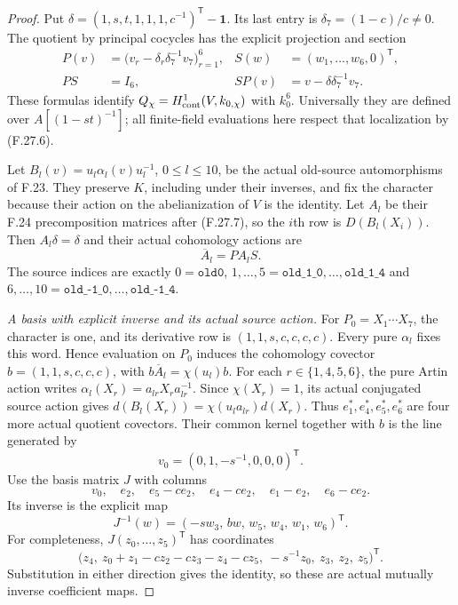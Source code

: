 \begin{proof}
Put $\delta=(1,s,t,1,1,1,c^{-1})^{\mathsf T}
-\mathbf1$. Its last entry is
$\delta_7=(1-c)/c\ne0$.
The quotient by principal cocycles has the explicit
projection and section
\[
 \begin{aligned}
 P(v)&=\bigl(v_r-\delta_r\delta_7^{-1}v_7\bigr)_{r=1}^6,
       &S(w)&=(w_1,\ldots,w_6,0)^{\mathsf T},\\
 PS&=I_6,
       &SP(v)&=v-\delta\delta_7^{-1}v_7.
 \end{aligned}                                                \tag{F.27.8}
\]
These formulas identify
$Q_\chi=H^1_{\rm cont}(V,k_{0,\chi})$ with $k_0^6$.
Universally they are defined over $A[(1-st)^{-1}]$;
all finite-field evaluations here respect that
localization by (F.27.6).

Let $B_l(v)=u_l\alpha_l(v)u_l^{-1}$, $0\leq l\leq10$,
be the actual old-source automorphisms of F.23.
They preserve $K$, including under their inverses,
and fix the character because their action on
the abelianization of $V$ is the identity.
Let $A_l$ be their F.24 precomposition matrices
after (F.27.7), so the $i$th row is $D(B_l(X_i))$.
Then $A_l\delta=\delta$ and their actual cohomology
actions are
\[
                           \overline A_l=PA_lS.
                                                               \tag{F.27.9}
\]
The source indices are exactly
$0=\texttt{old0}$,
$1,\ldots,5=\texttt{old\_1\_0},\ldots,\texttt{old\_1\_4}$
and $6,\ldots,10=\texttt{old\_-1\_0},\ldots,
\texttt{old\_-1\_4}$.

\emph{A basis with explicit inverse and its actual source action.}
For $P_0=X_1\cdots X_7$, the character is one,
and its derivative row is $(1,1,s,c,c,c,c)$.
Every pure $\alpha_l$ fixes this word. Hence
evaluation on $P_0$ induces the cohomology
covector $b=(1,1,s,c,c,c)$, with
$b\overline A_l=\chi(u_l)b$.
For each $r\in\{1,4,5,6\}$, the pure Artin
action writes $\alpha_l(X_r)=a_{lr}X_ra_{lr}^{-1}$.
Since $\chi(X_r)=1$, its actual conjugated source
action gives
$d(B_l(X_r))=\chi(u_la_{lr})d(X_r)$.
Thus $e_1^*,e_4^*,e_5^*,e_6^*$ are four more
actual quotient covectors. Their common kernel
together with $b$ is the line generated by
\[
                      v_0=(0,1,-s^{-1},0,0,0)^{\mathsf T}.
                                                               \tag{F.27.10}
\]
Use the basis matrix $J$ with columns
\[
       v_0,\quad e_2,\quad e_5-ce_2,\quad e_4-ce_2,
                       \quad e_1-e_2,\quad e_6-ce_2.
                                                               \tag{F.27.11}
\]
Its inverse is the explicit map
\[
 J^{-1}(w)=(-sw_3,\,bw,\,w_5,\,w_4,\,w_1,\,w_6)^{\mathsf T}.
                                                               \tag{F.27.12}
\]
For completeness, $J(z_0,\ldots,z_5)^{\mathsf T}$ has
coordinates
\[
 \bigl(z_4,\ z_0+z_1-cz_2-cz_3-z_4-cz_5,
          \ -s^{-1}z_0,\ z_3,\ z_2,\ z_5\bigr)^{\mathsf T}.
                                                               \tag{F.27.13}
\]
Substitution in either direction gives the identity,
so these are actual mutually inverse coefficient maps.


\end{proof}

